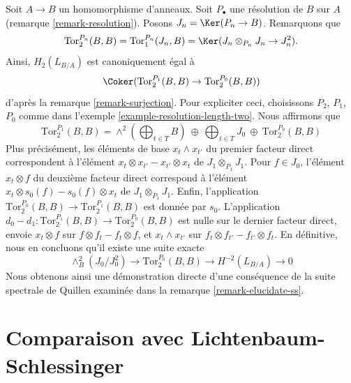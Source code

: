 \begin{remark}
\label{remark-elucidate-degree-two}
Soit $A \to B$ un homomorphisme d'anneaux. Soit $P_\bullet$ une résolution de
$B$ sur $A$ (remarque \ref{remark-resolution}). Posons
$J_n = \Ker(P_n \to B)$. Remarquons que
$$
\text{Tor}_2^{P_n}(B, B) = 
\text{Tor}_1^{P_n}(J_n, B) =
\Ker(J_n \otimes_{P_n} J_n \to J_n^2).
$$
Ainsi, $H_2(L_{B/A})$ est canoniquement égal à
$$
\Coker(\text{Tor}_2^{P_1}(B, B) \to \text{Tor}_2^{P_0}(B, B))
$$
d'après la remarque \ref{remark-surjection}. Pour expliciter ceci, choisissons
$P_2$, $P_1$, $P_0$ comme dans l'exemple
\ref{example-resolution-length-two}. Nous affirmons que
$$
\text{Tor}_2^{P_1}(B, B) =
\wedge^2(\bigoplus\nolimits_{t \in T} B)\ \oplus
\ \bigoplus\nolimits_{t \in T} J_0\ \oplus
\ \text{Tor}_2^{P_0}(B, B)
$$
Plus précisément, les éléments de base $x_t \wedge x_{t'}$ du premier facteur
direct correspondent à l'élément
$x_t \otimes x_{t'} - x_{t'} \otimes x_t$ de $J_1 \otimes_{P_1} J_1$. Pour
$f \in J_0$, l'élément $x_t \otimes f$ du deuxième facteur direct correspond
à l'élément $x_t \otimes s_0(f) - s_0(f) \otimes x_t$ de
$J_1 \otimes_{P_1} J_1$. Enfin, l'application
$\text{Tor}_2^{P_0}(B, B) \to \text{Tor}_2^{P_1}(B, B)$ est donnée par $s_0$.
L'application
$d_0 - d_1 : \text{Tor}_2^{P_1}(B, B) \to \text{Tor}_2^{P_0}(B, B)$
est nulle sur le dernier facteur direct, envoie $x_t \otimes f$ sur
$f \otimes f_t - f_t \otimes f$, et $x_t \wedge x_{t'}$ sur
$f_t \otimes f_{t'} - f_{t'} \otimes f_t$. En définitive, nous en concluons
qu'il existe une suite exacte
$$
\wedge^2_B(J_0/J_0^2) \to \text{Tor}_2^{P_0}(B, B) \to H^{-2}(L_{B/A}) \to 0
$$
Nous obtenons ainsi une démonstration directe d'une conséquence de la suite
spectrale de Quillen examinée dans la remarque \ref{remark-elucidate-ss}.
\end{remark}






\section{Comparaison avec Lichtenbaum-Schlessinger}
\label{section-compare-higher}

